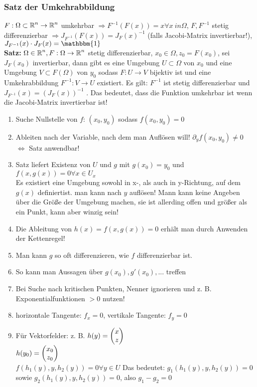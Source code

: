 \documentclass[german]{latex4ei/latex4ei_sheet}
\begin{document}
\subsubsection{Satz der Umkehrabbildung}
$F:\Omega \subset \operatorname{\mathbb R}^n \to \operatorname{\mathbb R}^n$ umkehrbar $\Rightarrow F^{-1}(F(x))=x \forall x\ in \Omega$, $F,F^{-1}$ stetig differenzierbar $\Rightarrow J_{F^{-1}}(F(x))=J_F(x)^{-1}$ (falls Jacobi-Matrix invertierbar!), $J_{F^{-1}}(x)\cdot J_F(x)=\mathbbm{1}$\\
\textbf{Satz:} $\Omega \in \operatorname{\mathbb R}^n, F: \Omega \to \operatorname{\mathbb R}^n$ stetig differenzierbar, $x_0 \in \Omega, z_0=F(x_0)$, sei $J_F(x_0)$ invertierbar, dann gibt es eine Umgebung $U \subset \Omega$ von $x_0$ und eine Umgebung $V\subset F(\Omega)$ von $y_0$ sodass $F: U \to V$ bijektiv ist und eine Umkehrabbildung $F^{-1}: V \to U$ existiert. Es gilt: $F^{-1}$ ist stetig differenzierbar und $J_{F^{-1}}(x)=(J_F(x))^{-1}$ . Das bedeutet, dass die Funktion umkehrbar ist wenn die Jacobi-Matrix invertierbar ist!\\

\begin{sectionbox}
\begin{enumerate}
\item Suche Nullstelle von $f$: $(x_0,y_0)$ sodass $f(x_0,y_0)=0$
\item Ableiten nach der Variable, nach dem man Aufl\"osen will! $\partial_y f(x_0,y_0)\neq 0$ $\Leftrightarrow$ Satz anwendbar!
\item Satz liefert Existenz von $U$ und $g$ mit $g(x_0)=y_0$ und $f(x,g(x))=0 \forall x \in U_x$\\
Es existiert eine Umgebung sowohl in x-, als auch in y-Richtung, auf dem $g(x)$ definiertist. man kann nach $y$ aufl\"osen! Mann kann keine Angeben \"uber die Gr\"o\ss{}e der Umgebung machen, sie ist allerding offen und gr\"o\ss{}er als ein Punkt, kann aber winzig sein!\\
\item Die Ableitung von $h(x)=f(x,g(x))=0$ erh\"alt man durch Anwenden der Kettenregel!
\item Man kann $g$ so oft differenzieren, wie $f$ differenzierbar ist.
\item So kann man Aussagen \"uber $g(x_0),g'(x_0),...$ treffen
\item Bei Suche nach kritischen Punkten, Nenner ignorieren und z. B. Exponentialfunktionen $>0$ nutzen!
\item horizontale Tangente: $f_x=0$, vertikale Tangente: $f_y=0$
\item F\"ur Vektorfelder: z. B. $h(y)=\begin{pmatrix} x \\ z \end{pmatrix}$\\
$h(y_0)=\begin{pmatrix} x_0 \\ z_0 \end{pmatrix}$\\
$f(h_1(y),y,h_2(y))=0 \forall y \in U$ Das bedeutet: $g_1(h_1(y),y,h_2(y))=0$ sowie $g_2(h_1(y),y,h_2(y))=0$, also $g_1-g_2=0$
\end{enumerate}
\end{sectionbox}
\end{document}
